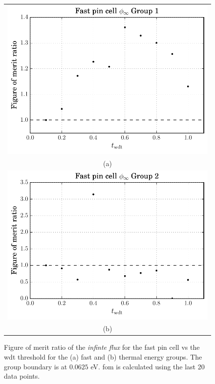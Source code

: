 \begin{figure}[hbtp]
  \centering
  \begin{tabular}{c}
  \includegraphics[scale=0.9]{images/results/fast_inf_flx_grp_1} \\
    (a) \\
  \includegraphics[scale=0.9]{images/results/fast_inf_flx_grp_2} \\
    (b) 
  \end{tabular}
  \caption[Figure of merit ratio of the \textit{infinte flux} for the
  PWR]{Figure of merit ratio of the \textit{infinte flux} for the fast pin cell vs the
    \gls{wdt} threshold for the (a) fast and (b) thermal energy
    groups. The group boundary is at $0.0625$ eV. \gls{fom} is
    calculated using the last 20 data points.}
  \label{fig:fast_inf_flx}
\end{figure}
